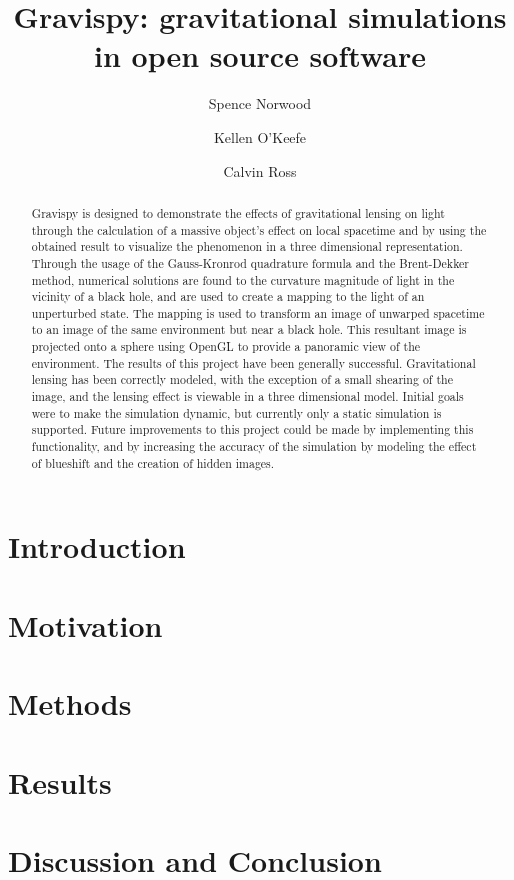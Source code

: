 \documentclass[
aps,prd,
preprint,
onecolumn,
12pt,
amsmath, amssymb,
secnumarabic,
]{revtex4-1}
\begin{document}
\title{Gravispy: gravitational simulations in open source software}
\author{Spence Norwood}
\author{Kellen O'Keefe}
\author{Calvin Ross}
\begin{abstract}
Gravispy is designed to demonstrate the effects of gravitational lensing on light through the calculation of a massive object’s effect on local spacetime and by using the obtained result to visualize the phenomenon in a three dimensional representation. Through the usage of the Gauss-Kronrod quadrature formula and the Brent-Dekker method, numerical solutions are found to the curvature magnitude of light in the vicinity of a black hole, and are used to create a mapping to the light of an unperturbed state. The mapping is used to transform an image of unwarped spacetime to an image of the same environment but near a black hole. This resultant image is projected onto a sphere using OpenGL to provide a panoramic view of the environment. The results of this project have been generally successful. Gravitational lensing has been correctly modeled, with the exception of a small shearing of the image, and the lensing effect is viewable in a three dimensional model. Initial goals were to make the simulation dynamic, but currently only a static simulation is supported. Future improvements to this project could be made by implementing this functionality, and by increasing the accuracy of the simulation by modeling the effect of blueshift and the creation of hidden images.
\end{abstract}
\maketitle

\section{Introduction\label{sec:intro}}


\section{Motivation\label{sec:motive}}


\section{Methods\label{sec:method}}


\section{Results\label{sec:results}}


\section{Discussion and Conclusion}


\nocite{*}

\end{document}
